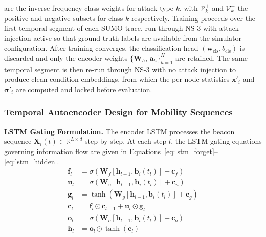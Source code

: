 \documentclass[12pt, a4paper]{report}
\begin{document}
are the inverse-frequency class weights for attack type $k$, with
$\mathcal{V}_k^{+}$ and $\mathcal{V}_k^{-}$ the positive and negative
subsets for class $k$ respectively.
\newline
\newline
Training proceeds over the first temporal segment of each SUMO
trace, run through NS-3 with attack injection active so that
ground-truth labels are available from the simulator configuration.
After training converges, the classification head
$(\mathbf{w}_{\mathrm{cls}}, b_{\mathrm{cls}})$ is discarded and
only the encoder weights
$\{\mathbf{W}_h,\,\mathbf{a}_h\}_{h=1}^{H}$ are retained. The
same temporal segment is then re-run through NS-3 with no attack
injection to produce clean-condition embeddings, from which the
per-node statistics $\bar{\mathbf{x}}'_i$ and
$\boldsymbol{\sigma}'_i$ are computed and locked before evaluation.


\subsubsection{Temporal Autoencoder Design for Mobility Sequences}

\textbf{LSTM Gating Formulation.}
The encoder LSTM processes the beacon sequence
$\mathbf{X}_i(t) \in \mathbb{R}^{L\times d}$ step by step. At each
step $l$, the LSTM gating equations governing information flow are
given in Equations~\ref{eq:lstm_forget}--\ref{eq:lstm_hidden}.
\begin{align}
  \mathbf{f}_l &= \sigma(\mathbf{W}_f[\mathbf{h}_{l-1},
    \mathbf{b}_i(t_l)] + \mathbf{c}_f)
  \label{eq:lstm_forget} \\
  \mathbf{u}_l &= \sigma(\mathbf{W}_u[\mathbf{h}_{l-1},
    \mathbf{b}_i(t_l)] + \mathbf{c}_u)
  \label{eq:lstm_input} \\
  \mathbf{g}_l &= \tanh(\mathbf{W}_g[\mathbf{h}_{l-1},
    \mathbf{b}_i(t_l)] + \mathbf{c}_g)
  \label{eq:lstm_gate} \\
  \mathbf{c}_l &= \mathbf{f}_l \odot \mathbf{c}_{l-1}
    + \mathbf{u}_l \odot \mathbf{g}_l
  \label{eq:lstm_cell} \\
  \mathbf{o}_l &= \sigma(\mathbf{W}_o[\mathbf{h}_{l-1},
    \mathbf{b}_i(t_l)] + \mathbf{c}_o)
  \label{eq:lstm_output} \\
  \mathbf{h}_l &= \mathbf{o}_l \odot \tanh(\mathbf{c}_l)
  \label{eq:lstm_hidden}
\end{align}
\end{document}
